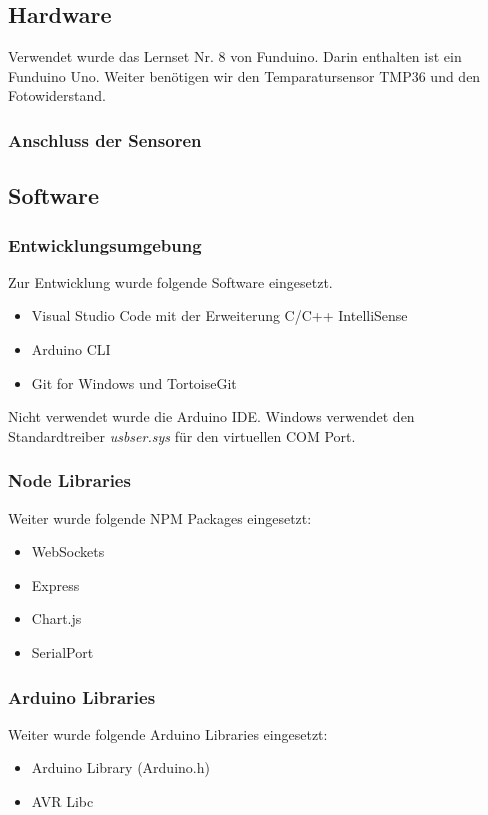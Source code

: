 \subsection{Hardware}
Verwendet wurde das Lernset Nr. 8 von Funduino\cite{lernset}. Darin enthalten ist ein Funduino Uno. Weiter benötigen wir den Temparatursensor TMP36 und den Fotowiderstand.

\subsubsection{Anschluss der Sensoren}

\subsection{Software}

\subsubsection{Entwicklungsumgebung}
Zur Entwicklung wurde folgende Software eingesetzt.
\begin{itemize}
    \item Visual Studio Code\cite{vscode} mit der Erweiterung C/C++ IntelliSense\cite{intellisense}
    \item Arduino CLI\cite{arduinoCli}
    \item Git for Windows\cite{gitForWindows} und TortoiseGit\cite{tortoiseGit} 
  \end{itemize}
Nicht verwendet wurde die Arduino IDE. Windows verwendet den Standardtreiber \textit {usbser.sys} für den virtuellen COM Port. 

\subsubsection{Node Libraries}
Weiter wurde folgende NPM Packages eingesetzt:
\begin{itemize}
  \item WebSockets \cite{websockets}
  \item Express \cite{express}
  \item Chart.js \cite{chartjs}
  \item SerialPort \cite{serialPort}
\end{itemize}

\subsubsection{Arduino Libraries}
Weiter wurde folgende Arduino Libraries eingesetzt:
\begin{itemize}
  \item Arduino Library (Arduino.h) \cite{sprachreferenz}
  \item AVR Libc \cite{avrlibc}
\end{itemize}

